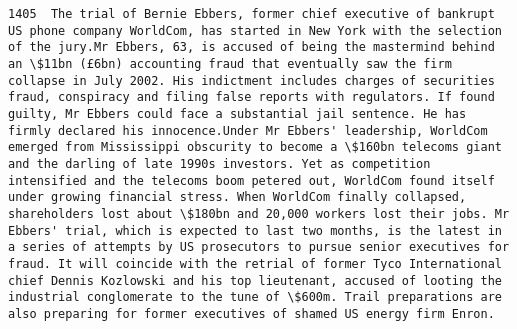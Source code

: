 \documentclass[11pt]{article}
\begin{document}
\begin{Verbatim}[commandchars=\\\{\}]
         1405  The trial of Bernie Ebbers, former chief executive of bankrupt US phone company WorldCom, has started in New York with the selection of the jury.Mr Ebbers, 63, is accused of being the mastermind behind an \$11bn (£6bn) accounting fraud that eventually saw the firm collapse in July 2002. His indictment includes charges of securities fraud, conspiracy and filing false reports with regulators. If found guilty, Mr Ebbers could face a substantial jail sentence. He has firmly declared his innocence.Under Mr Ebbers' leadership, WorldCom emerged from Mississippi obscurity to become a \$160bn telecoms giant and the darling of late 1990s investors. Yet as competition intensified and the telecoms boom petered out, WorldCom found itself under growing financial stress. When WorldCom finally collapsed, shareholders lost about \$180bn and 20,000 workers lost their jobs. Mr Ebbers' trial, which is expected to last two months, is the latest in a series of attempts by US prosecutors to pursue senior executives for fraud. It will coincide with the retrial of former Tyco International chief Dennis Kozlowski and his top lieutenant, accused of looting the industrial conglomerate to the tune of \$600m. Trail preparations are also preparing for former executives of shamed US energy firm Enron.                                                                                                                                                                                                                                                                                                                                                                                                                                                                                                                                                                                                                                                                                                                                                                                                                                                                                                                                                                                                                                                                                                                                                                                                                                                                                                                                                                                                                                                                                                                                                                                                                                                                                                                                                                                                                                                                                                                                                                                                                                                                         
\end{Verbatim}
\end{document}
